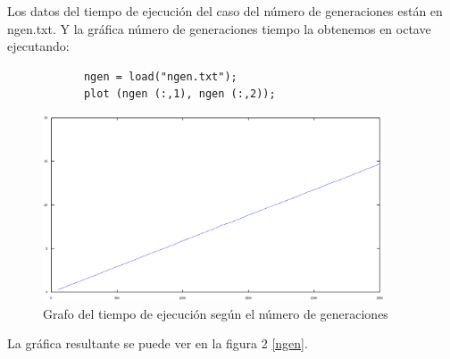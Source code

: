 \documentclass[a4,12pt,graphicx,caption,rotating]{article}
\begin{document}
Los datos del tiempo de ejecución del caso del número de generaciones están en ngen.txt.
Y la gráfica número de generaciones tiempo la obtenemos en octave ejecutando:
\begin{verbatim}
            ngen = load("ngen.txt");
            plot (ngen (:,1), ngen (:,2));
\end{verbatim}
\begin{figure}[t]
\begin{center}
\includegraphics[width=0.9\textwidth]{graph/ngen}
\end{center}
\caption{Grafo del tiempo de ejecución según el número de generaciones}
\label{fig:ngen}
\end{figure}
La gráfica resultante se puede ver en la figura 2 \ref{ngen}.
\end{document}
